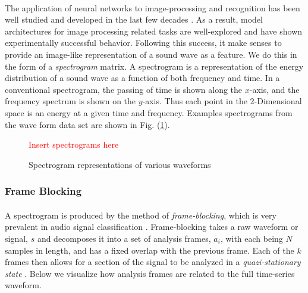 \documentclass[12pt,letterpaper]{article}
\begin{document}
\paragraph*{}The application of neural networks to image-processing and recognition has been well studied and developed in the last few decades \cite{Geron,Goodfellow,Loy,Mierswa}. As a result, model architectures for image processing related tasks are well-explored and have shown experimentally successful behavior. Following this success, it make senses to provide an image-like representation of a sound wave as a feature. We do this in the form of a \textit{spectrogram} matrix. A spectrogram is a representation of the energy distribution of a sound wave as a function of both frequency and time. In a conventional spectrogram, the passing of time is shown along the $x$-axis, and the frequency spectrum is shown on the $y$-axis. Thus each point in the 2-Dimensional space is an energy at a given time and frequency. Examples spectrograms from the wave form data set are shown in Fig. (\ref{fig-spectrograms}).
\begin{figure}[H]
\begin{center}
\textcolor{red}{Insert spectrograms here}
\caption{Spectrogram representations of various waveforms}
\label{fig-spectrograms}
\end{center}
\end{figure}


\subsubsection{Frame Blocking}
\label{subsubsec-FrameBlocking}

\paragraph*{}A spectrogram is produced by the method of \textit{frame-blocking}, which is very prevalent in audio signal classification \cite{Liu,Zhang}. Frame-blocking takes a raw waveform or signal, $s$ and decomposes it into a set of analysis frames, $a_i$, with each being $N$ samples in length, and has a fixed overlap with the previous frame. Each of the $k$ frames then allows for a section of the signal to be analyzed in a \textit{quazi-stationary state} \cite{Kahn,Serizel}. Below we visualize how analysis frames are related to the full time-series waveform. 
\end{document}
